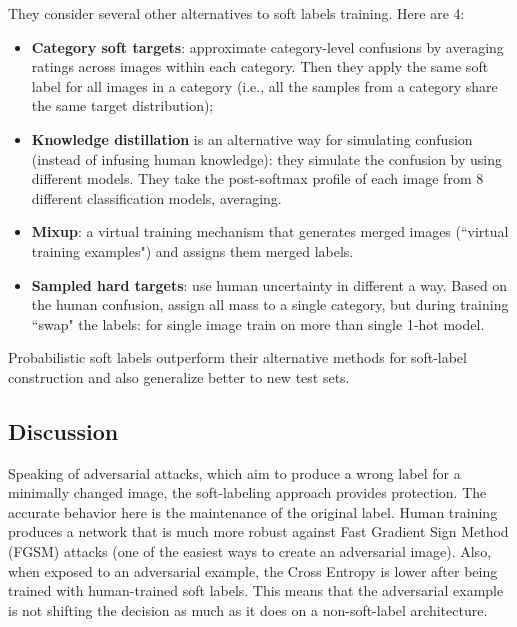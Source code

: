 They consider several other alternatives to soft labels training. Here are 4:
\begin{itemize}
    \item \textbf{Category soft targets}: approximate category-level confusions by averaging ratings across images within each category. Then they apply the same soft label for all images in a category (i.e., all the samples from a category share the same target distribution);
    \item \textbf{Knowledge distillation} is an alternative way for simulating confusion (instead of infusing human knowledge): they simulate the confusion by using different models. They take the post-softmax profile of each image from 8 different classification models, averaging.
\end{itemize}

\begin{itemize}
    \item \textbf{Mixup}: a virtual training mechanism that generates merged images (``virtual training examples") and assigns them merged labels.
    \item \textbf{Sampled hard targets}: use human uncertainty in different a way. Based on the human confusion, assign all mass to a single category, but during training ``swap" the labels: for single image train on more than single 1-hot model.
\end{itemize}

Probabilistic soft labels outperform their alternative methods for soft-label construction and also generalize better to new test sets.

\subsection{Discussion}
Speaking of adversarial attacks, which aim to produce a wrong label for a minimally changed image, the soft-labeling approach provides protection. The accurate behavior here is the maintenance of the original label. Human training produces a network that is much more robust against Fast Gradient Sign Method (FGSM) attacks (one of the easiest ways to create an adversarial image).
Also, when exposed to an adversarial example, the Cross Entropy is lower after being trained with human-trained soft labels. This means that the adversarial example is not shifting the decision as much as it does on a non-soft-label architecture.\\

